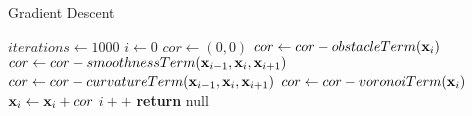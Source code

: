 \begin{algorithm}
    \caption{Gradient Descent}\label{alg:gradientDescent}
    \begin{algorithmic}[1]
    \State $iterations \gets 1000$
    \State $i \gets 0$
        	\ForAll {$\bldx \in \calP$}
        		\State $cor \gets  (0,0)$
        		\State $cor \gets  cor - obstacleTerm(\mathbf{x}_{i})$
        		\State $cor \gets  cor - smoothnessTerm(\mathbf{x}_{i-1},\mathbf{x}_{i},\mathbf{x}_{i+1})$
        		\State $cor \gets  cor - curvatureTerm(\mathbf{x}_{i-1},\mathbf{x}_{i},\mathbf{x}_{i+1})$
        		\State $cor \gets  cor - voronoiTerm(\mathbf{x}_{i})$
        		\State $\mathbf{x}_{i} \gets \mathbf{x}_{i} + cor$
        	\EndFor
        \State $i++$
        \EndWhile
        \State \textbf{return} null
    \end{algorithmic}
\end{algorithm}
